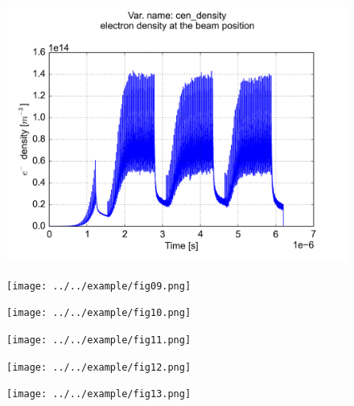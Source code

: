 \documentclass[a4paper,12pt]{article}
\begin{document}
\begin{figure}[p]
\begin{center}
\includegraphics[trim = 0 0 0 0, clip, width=.95\textwidth]{../../example/fig08.png}
\end{center}
\end{figure}

\begin{figure}[p]
\begin{center}
\texttt{[image: ../../example/fig09.png]}
\end{center}
\end{figure}

\begin{figure}[p]
\begin{center}
\texttt{[image: ../../example/fig10.png]}
\end{center}
\end{figure}

\begin{figure}[p]
\begin{center}
\texttt{[image: ../../example/fig11.png]}
\end{center}
\end{figure}

\begin{figure}[p]
\begin{center}
\texttt{[image: ../../example/fig12.png]}
\end{center}
\end{figure}

\begin{figure}[p]
\begin{center}
\texttt{[image: ../../example/fig13.png]}
\end{center}
\end{figure}
\end{document}
